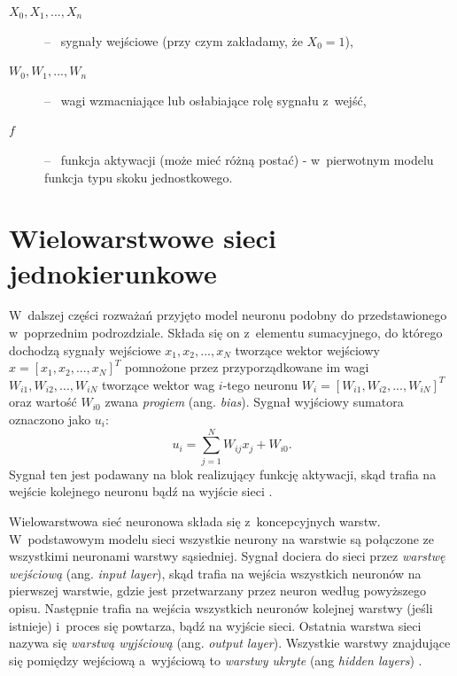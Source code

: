 \documentclass[a4paper, 12pt, oneside]{report}
\begin{document}
\begin{description}
\item[$X_0, X_1, ..., X_n$] -- \ sygnały wejściowe (przy czym zakładamy, że $X_0=1$),
\item[$W_0, W_1, ..., W_n$] -- \ wagi wzmacniające lub osłabiające rolę sygnału z~wejść,
\item[$f$] -- \ funkcja aktywacji (może mieć różną postać) - w~pierwotnym modelu funkcja typu skoku jednostkowego.
\end{description}

\section{Wielowarstwowe sieci jednokierunkowe}

 W~dalszej części rozważań przyjęto model neuronu podobny do przedstawionego w~poprzednim podrozdziale. Składa się on z~elementu sumacyjnego, do którego dochodzą sygnały wejściowe $x_1, x_2, ..., x_N$ tworzące wektor wejściowy $x=[x_1, x_2, ..., x_N]^T$ pomnożone przez przyporządkowane im wagi $W_{i1}, W_{i2}, ..., W_{iN}$ tworzące wektor wag $i$-tego neuronu $W_i=[W_{i1}, W_{i2}, ..., W_{iN}]^T$ oraz wartość $W_{i0}$ zwana \emph{progiem} (ang. \emph{bias}). Sygnał wyjściowy sumatora oznaczono jako $u_i$:
\begin{equation}
u_i=\sum_{j=1}^{N} W_{ij}x_j+W_{i0}.
\end{equation}
Sygnał ten jest podawany na blok realizujący funkcję aktywacji, skąd trafia na wejście kolejnego neuronu bądź na wyjście sieci \cite{Osowski96}.

Wielowarstwowa sieć neuronowa składa się z~koncepcyjnych warstw. W~podstawowym modelu sieci wszystkie neurony na warstwie są połączone ze wszystkimi neuronami warstwy sąsiedniej. Sygnał dociera do sieci przez \emph{warstwę wejściową} (ang. \emph{input layer}), skąd trafia na wejścia wszystkich neuronów na pierwszej warstwie, gdzie jest przetwarzany przez neuron według powyższego opisu. Następnie trafia na wejścia wszystkich neuronów kolejnej warstwy (jeśli istnieje) i~proces się powtarza, bądź na wyjście sieci. Ostatnia warstwa sieci nazywa się \emph{warstwą wyjściową} (ang. \emph{output layer}). Wszystkie warstwy znajdujące się pomiędzy wejściową a~wyjściową to \emph{warstwy ukryte} (ang \emph{hidden layers}) \cite{Flasinski11}.
\end{document}
